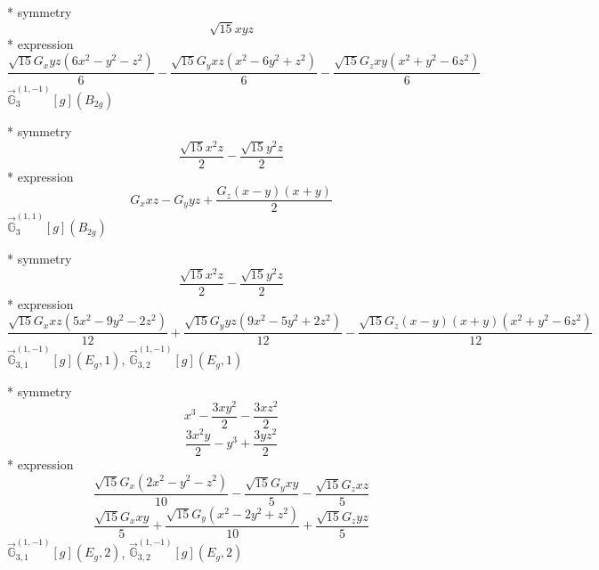 \documentclass[fleqn,8pt]{jsarticle}
\begin{document}
\noindent\quad ** symmetry
\begin{dmath*}
\sqrt{15} x y z
\end{dmath*}
\noindent\quad ** expression
\begin{dmath*}
\frac{\sqrt{15} G_{x} y z \left(6 x^{2} - y^{2} - z^{2}\right)}{6} - \frac{\sqrt{15} G_{y} x z \left(x^{2} - 6 y^{2} + z^{2}\right)}{6} - \frac{\sqrt{15} G_{z} x y \left(x^{2} + y^{2} - 6 z^{2}\right)}{6}
\end{dmath*}
\noindent\quad $\vec{\mathbb{G}}_{3}^{(1,-1)}[g](B_{2g})$

\noindent\quad ** symmetry
\begin{dmath*}
\frac{\sqrt{15} x^{2} z}{2} - \frac{\sqrt{15} y^{2} z}{2}
\end{dmath*}
\noindent\quad ** expression
\begin{dmath*}
G_{x} x z - G_{y} y z + \frac{G_{z} \left(x - y\right) \left(x + y\right)}{2}
\end{dmath*}
\noindent\quad $\vec{\mathbb{G}}_{3}^{(1,1)}[g](B_{2g})$

\noindent\quad ** symmetry
\begin{dmath*}
\frac{\sqrt{15} x^{2} z}{2} - \frac{\sqrt{15} y^{2} z}{2}
\end{dmath*}
\noindent\quad ** expression
\begin{dmath*}
\frac{\sqrt{15} G_{x} x z \left(5 x^{2} - 9 y^{2} - 2 z^{2}\right)}{12} + \frac{\sqrt{15} G_{y} y z \left(9 x^{2} - 5 y^{2} + 2 z^{2}\right)}{12} - \frac{\sqrt{15} G_{z} \left(x - y\right) \left(x + y\right) \left(x^{2} + y^{2} - 6 z^{2}\right)}{12}
\end{dmath*}
\noindent\quad $\vec{\mathbb{G}}_{3,1}^{(1,-1)}[g](E_{g},1)$, $\vec{\mathbb{G}}_{3,2}^{(1,-1)}[g](E_{g},1)$

\noindent\quad ** symmetry
\begin{dmath*}
x^{3} - \frac{3 x y^{2}}{2} - \frac{3 x z^{2}}{2}
\end{dmath*}
\begin{dmath*}
\frac{3 x^{2} y}{2} - y^{3} + \frac{3 y z^{2}}{2}
\end{dmath*}
\noindent\quad ** expression
\begin{dmath*}
\frac{\sqrt{15} G_{x} \left(2 x^{2} - y^{2} - z^{2}\right)}{10} - \frac{\sqrt{15} G_{y} x y}{5} - \frac{\sqrt{15} G_{z} x z}{5}
\end{dmath*}
\begin{dmath*}
\frac{\sqrt{15} G_{x} x y}{5} + \frac{\sqrt{15} G_{y} \left(x^{2} - 2 y^{2} + z^{2}\right)}{10} + \frac{\sqrt{15} G_{z} y z}{5}
\end{dmath*}
\noindent\quad $\vec{\mathbb{G}}_{3,1}^{(1,-1)}[g](E_{g},2)$, $\vec{\mathbb{G}}_{3,2}^{(1,-1)}[g](E_{g},2)$
\end{document}
